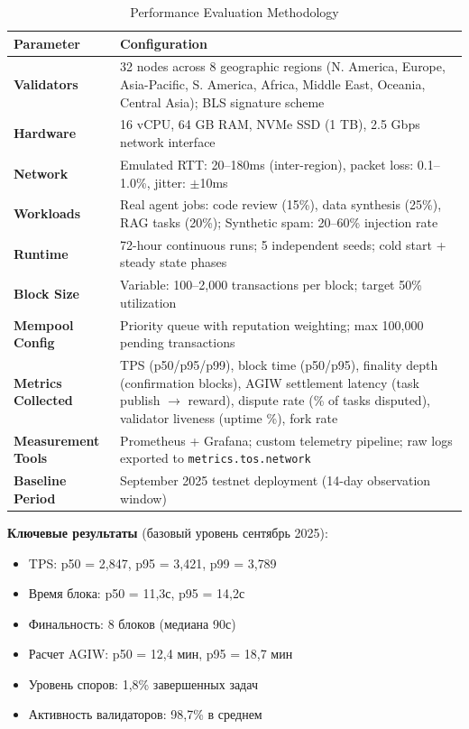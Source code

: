 \documentclass[11pt]{article}
\begin{document}
\begin{table}[H]
\centering
\caption{Performance Evaluation Methodology}
\label{tab:evaluation-methodology}
\begin{tabular}{@{}p{}p{}@{}}
\toprule
\textbf{Parameter} & \textbf{Configuration} \\ \midrule
\textbf{Validators} & 32 nodes across 8 geographic regions (N. America, Europe, Asia-Pacific, S. America, Africa, Middle East, Oceania, Central Asia); BLS signature scheme \\
\textbf{Hardware} & 16 vCPU, 64 GB RAM, NVMe SSD (1 TB), 2.5 Gbps network interface \\
\textbf{Network} & Emulated RTT: 20--180ms (inter-region), packet loss: 0.1--1.0\%, jitter: $\pm$10ms \\
\textbf{Workloads} & Real agent jobs: code review (15\%), data synthesis (25\%), RAG tasks (20\%); Synthetic spam: 20--60\% injection rate \\
\textbf{Runtime} & 72-hour continuous runs; 5 independent seeds; cold start + steady state phases \\
\textbf{Block Size} & Variable: 100--2,000 transactions per block; target 50\% utilization \\
\textbf{Mempool Config} & Priority queue with reputation weighting; max 100,000 pending transactions \\
\textbf{Metrics Collected} & TPS (p50/p95/p99), block time (p50/p95), finality depth (confirmation blocks), AGIW settlement latency (task publish $\rightarrow$ reward), dispute rate (\% of tasks disputed), validator liveness (uptime \%), fork rate \\
\textbf{Measurement Tools} & Prometheus + Grafana; custom telemetry pipeline; raw logs exported to \texttt{metrics.tos.network} \\
\textbf{Baseline Period} & September 2025 testnet deployment (14-day observation window) \\
\bottomrule
\end{tabular}
\end{table}

\textbf{Ключевые результаты} (базовый уровень сентябрь 2025):
\begin{itemize}[noitemsep]
  \item TPS: p50 = 2{,}847, p95 = 3{,}421, p99 = 3{,}789
  \item Время блока: p50 = 11,3с, p95 = 14,2с
  \item Финальность: 8 блоков (медиана 90с)
  \item Расчет AGIW: p50 = 12,4 мин, p95 = 18,7 мин
  \item Уровень споров: 1,8\% завершенных задач
  \item Активность валидаторов: 98,7\% в среднем
\end{itemize}
\end{document}
